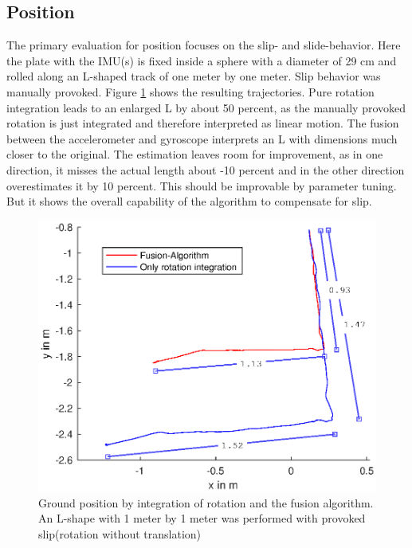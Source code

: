 \documentclass[letterpaper, 10 pt, conference]{ieeeconf}  %
\begin{document}
\subsection{Position}
The primary evaluation for position focuses on the slip- and slide-behavior.
Here the plate with the IMU(s) is fixed inside a sphere with a diameter of 29 cm and rolled along an L-shaped track of one meter by one meter.
Slip behavior was manually provoked.
Figure \ref{LTest} shows the resulting trajectories.
Pure rotation integration leads to an enlarged L by about 50 percent, as the manually provoked rotation is just integrated and therefore interpreted as linear motion.
The fusion between the accelerometer and gyroscope interprets an L with dimensions much closer to the original.
The estimation leaves room for improvement, as in one direction, it misses the actual length about -10 percent and in the other direction overestimates it by 10 percent. This should be improvable by parameter tuning.
But it shows the overall capability of the algorithm to compensate for slip. 

\begin{figure}
\includegraphics[width=\linewidth]{./graphics/LTest.eps}
\caption{Ground position by integration of rotation and the fusion algorithm. An L-shape with 1 meter by 1 meter was performed with provoked slip(rotation without translation)}
\label{LTest}
\end{figure}
\end{document}
